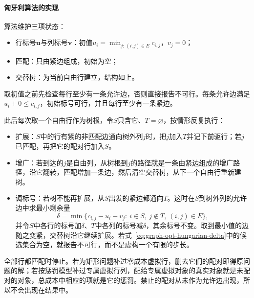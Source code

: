 \paragraph{匈牙利算法的实现}
算法维护三项状态：
\begin{itemize}
  \item 行标号$\bm u$与列标号$\bm v$：初值$u_i=\min_{j:\,(i,j)\in E}c_{i,j}$，$v_j=0$；
  \item 匹配：只由紧边组成，初始为空；
  \item 交替树：为当前自由行建立，结构如上。
\end{itemize}
取初值之前先检查每行至少有一条允许边，否则直接报告不可行。每条允许边满足$u_i+0\leq c_{i,j}$，初始标号可行，并且每行至少有一条紧边。

此后每次取一个自由行作为树根，令$S$只含它、$T=\varnothing$，按情形反复执行：
\begin{itemize}
  \item 扩展：$S$中的行有紧的非匹配边通向树外列$j$时，把$j$加入$T$并记下前驱行；若$j$已匹配，再把它的配对行加入$S$。
  \item 增广：若到达的$j$是自由列，从树根到$j$的路径就是一条由紧边组成的增广路径，沿它翻转，匹配增加一条边，然后清空交替树，从下一个自由行重新建树。
  \item 调标号：若树不能再扩展，从$S$出发的紧边都通向$T$。这时在$S$到树外列的允许边中求最小剩余量
  \begin{equation}
    \delta=\min\bigl\{c_{i,j}-u_i-v_j:\ i\in S,\ j\notin T,\ (i,j)\in E\bigr\},
    \label{eq:graph-opt-hungarian-delta}
  \end{equation}
  并令$S$中各行的标号加$\delta$、$T$中各列的标号减$\delta$，其余标号不变。取到最小值的边随之变紧，交替树沿它继续扩展。若式~\eqref{eq:graph-opt-hungarian-delta}中的候选集合为空，就报告不可行，而不是虚构一个有限的步长。
\end{itemize}

全部行都匹配时停止。若为矩形问题补过零成本虚拟行，删去它们的配对即得原问题的解；若按惩罚模型补过专属虚拟行列，配给专属虚拟对象的真实对象就是未配对的对象，总成本中相应的项就是它的惩罚。禁止的配对从未作为允许边出现，所以不会出现在结果中。


